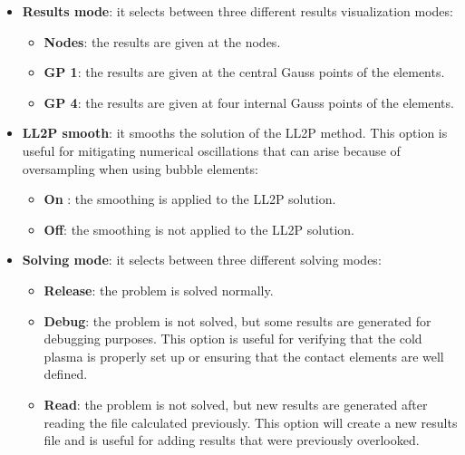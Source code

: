 \begin{itemize}
	\begin{itemize}\itemsep0.25em 
		\item \textbf{On }: the problem is solved with the stabilized term \ref{LL2PStab} with $h_{k} = 1$.
		\item \textbf{Off}: the problem is solved without the stabilization term \ref{LL2PNodalBubb}-\ref{LL2PPotentials}.
	\end{itemize}
	\quad
	\item \textbf{Results mode}: it selects between three different results visualization modes:
	\begin{itemize}\itemsep0.25em 
		\item \textbf{Nodes}: the results are given at the nodes.
		\item \textbf{GP 1}: the results are given at the central Gauss points of the elements.
		\item \textbf{GP 4}: the results are given at four internal Gauss points of the elements.
	\end{itemize}
	\quad
	\item \textbf{LL2P smooth}: it smooths the solution of the LL2P method. This option is useful for mitigating numerical oscillations that can arise because of oversampling when using bubble elements:
	\begin{itemize}\itemsep0.25em 
		\item \textbf{On }: the smoothing is applied to the LL2P solution.
		\item \textbf{Off}: the smoothing is not applied to the LL2P solution.
	\end{itemize}
	\quad
	\item \textbf{Solving mode}: it selects between three different solving modes:
	\begin{itemize}\itemsep0.5em 
		\item \textbf{Release}: the problem is solved normally.
		\item \textbf{Debug}: the problem is not solved, but some results are generated for debugging purposes. This option is useful for verifying that the cold plasma is properly set up or ensuring that the contact elements are well defined.
		\item \textbf{Read}: the problem is not solved, but new results are generated after reading the  file calculated previously. This option will create a new results file and is useful for adding results that were previously overlooked.
	\end{itemize}
\end{itemize}

